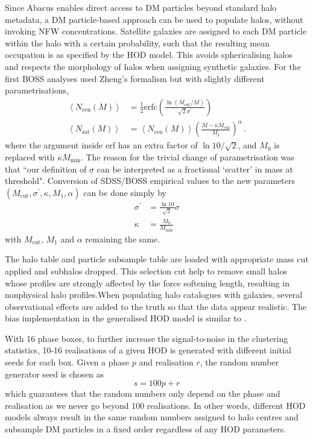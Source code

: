 \documentclass[10pt,A4]{aastex62}
\begin{document}
			Since Abacus enables direct access to DM particles beyond standard halo metadata, a DM particle-based approach can be used to populate halos, without invoking NFW concentrations. Satellite galaxies are assigned to each DM particle within the halo with a certain probability, such that the resulting mean occupation is as specified by the HOD model. This avoids sphericalising halos and respects the morphology of halos when assigning synthetic galaxies. For the first BOSS analyses \cite{white11} used Zheng's formalism but with slightly different parametrisations,
			\begin{align}
				\left< N_\text{cen} (M) \right> &= \frac{1}{2} \mathrm{erfc} \left( \frac{\ln(M_\text{cut} / M)}{\sqrt{2} \sigma^\prime} \right) \\
				\left< N_\text{sat} (M) \right> &= \left< N_\text{cen} (M) \right> \left( \frac{M - \kappa M _\text{cut} }{M_1} \right) ^\alpha \, .
			\end{align}
			where the argument inside erf has an extra factor of $\ln 10 / \sqrt{2}$, and $M_0$ is replaced with $\kappa M_\text{min}$. The reason for the trivial change of parametrisation was that ``our definition of $\sigma$ can be interpreted as a fractional `scatter' in mass at threshold". Conversion of SDSS/BOSS empirical values to the new parameters $(M_\text{cut}, \sigma^\prime, \kappa, M_1, \alpha)$  can be done simply by
			\begin{align}
				\sigma ^\prime &= \frac{\ln 10}{\sqrt{2}} \sigma \\
				\kappa &= \frac{M_0}{M_\text{min}}
			\end{align}
			with $M_\text{cut}$, $M_1$ and $\alpha$ remaining the same.
			
			The halo table and particle subsample table are loaded with appropriate mass cut applied and subhalos dropped. This selection cut help to remove small halos whose profiles are strongly
			affected by the force softening length, resulting in nonphysical halo profiles.When populating halo catalogues with galaxies, several observational effects are added to the truth so that the data appear realistic. The bias implementation in the generalised HOD model is similar to \cite{yuan2018}.
			
			With 16 phase boxes, to further increase the signal-to-noise in the clustering statistics, 10-16 realisations of a given HOD is generated with different initial seeds for each box. Given a phase $p$ and realisation $r$, the random number generator seed is chosen as
			\begin{equation}
				s = 100p + r
			\end{equation}
			which guarantees that the random numbers only depend on the phase and realisation as we never go beyond 100 realisations. In other words, different HOD models always result in the same random numbers assigned to halo centres and subsample DM particles in a fixed order regardless of any HOD parameters. 
\end{document}
